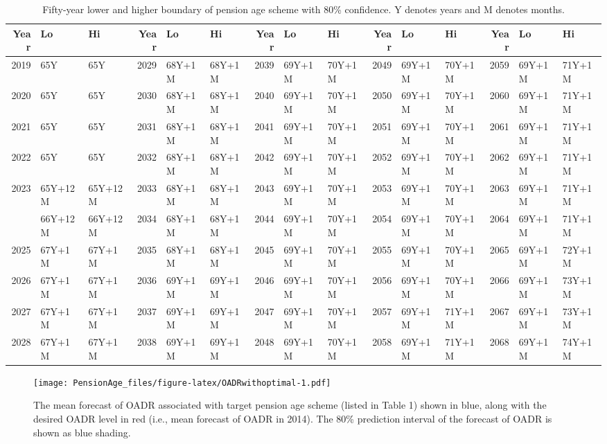 \documentclass[11pt,a4paper,]{article}
\begin{document}
\begin{table}

\caption{\label{tab:pensionagetables2}Fifty-year lower and higher boundary of pension age scheme with 80\% confidence. Y denotes years and M denotes months.}
\centering
\fontsize{7}{9}\selectfont
\begin{tabular}[t]{rllrllrllrllrll}
\toprule
Year & Lo & Hi & Year & Lo & Hi & Year & Lo & Hi & Year & Lo & Hi & Year & Lo & Hi\\
\midrule
2019 & 65Y & 65Y & 2029 & 68Y+1M & 68Y+1M & 2039 & 69Y+1M & 70Y+1M & 2049 & 69Y+1M & 70Y+1M & 2059 & 69Y+1M & 71Y+1M\\
2020 & 65Y & 65Y & 2030 & 68Y+1M & 68Y+1M & 2040 & 69Y+1M & 70Y+1M & 2050 & 69Y+1M & 70Y+1M & 2060 & 69Y+1M & 71Y+1M\\
2021 & 65Y & 65Y & 2031 & 68Y+1M & 68Y+1M & 2041 & 69Y+1M & 70Y+1M & 2051 & 69Y+1M & 70Y+1M & 2061 & 69Y+1M & 71Y+1M\\
2022 & 65Y & 65Y & 2032 & 68Y+1M & 68Y+1M & 2042 & 69Y+1M & 70Y+1M & 2052 & 69Y+1M & 70Y+1M & 2062 & 69Y+1M & 71Y+1M\\
2023 & 65Y+12M & 65Y+12M & 2033 & 68Y+1M & 68Y+1M & 2043 & 69Y+1M & 70Y+1M & 2053 & 69Y+1M & 70Y+1M & 2063 & 69Y+1M & 71Y+1M\\
\addlinespace
2024 & 66Y+12M & 66Y+12M & 2034 & 68Y+1M & 68Y+1M & 2044 & 69Y+1M & 70Y+1M & 2054 & 69Y+1M & 70Y+1M & 2064 & 69Y+1M & 71Y+1M\\
2025 & 67Y+1M & 67Y+1M & 2035 & 68Y+1M & 68Y+1M & 2045 & 69Y+1M & 70Y+1M & 2055 & 69Y+1M & 70Y+1M & 2065 & 69Y+1M & 72Y+1M\\
2026 & 67Y+1M & 67Y+1M & 2036 & 69Y+1M & 69Y+1M & 2046 & 69Y+1M & 70Y+1M & 2056 & 69Y+1M & 70Y+1M & 2066 & 69Y+1M & 73Y+1M\\
2027 & 67Y+1M & 67Y+1M & 2037 & 69Y+1M & 69Y+1M & 2047 & 69Y+1M & 70Y+1M & 2057 & 69Y+1M & 71Y+1M & 2067 & 69Y+1M & 73Y+1M\\
2028 & 67Y+1M & 67Y+1M & 2038 & 69Y+1M & 69Y+1M & 2048 & 69Y+1M & 70Y+1M & 2058 & 69Y+1M & 71Y+1M & 2068 & 69Y+1M & 74Y+1M\\
\bottomrule
\end{tabular}
\end{table}

\begin{figure}
\centering
\texttt{[image: PensionAge\_files/figure-latex/OADRwithoptimal-1.pdf]}
\caption{\label{fig:OADRwithoptimal}The mean forecast of OADR associated with target pension age scheme (listed in Table 1) shown in blue, along with the desired OADR level in red (i.e., mean forecast of OADR in 2014). The 80\% prediction interval of the forecast of OADR is shown as blue shading.}
\end{figure}
\end{document}

